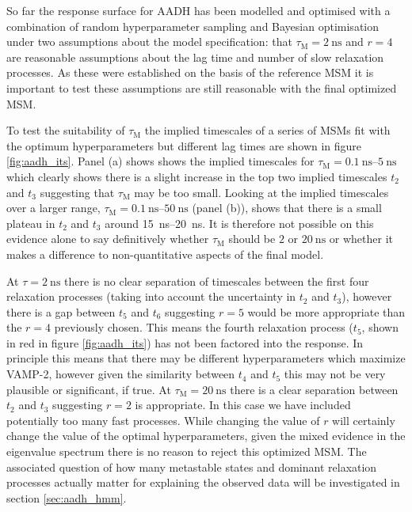 So far the response surface for AADH has been modelled and optimised with a combination of random hyperparameter sampling and Bayesian optimisation under two assumptions about the model specification: that $\tau_{\mathrm{M}} = \SI{2}{\nano\second}$ and $r=4$ are reasonable assumptions about the lag time and number of slow relaxation processes. As these were established on the basis of the reference MSM it is important to test these assumptions are still reasonable with the final optimized MSM. 

To test the suitability of $\tau_{\mathrm{M}}$ the implied timescales of a series of MSMs fit with the optimum hyperparameters but different lag times are shown in figure \ref{fig:aadh_its}. Panel (a) shows shows the implied timescales for $\tau_{\mathrm{M}} = \SIrange[range-phrase=\text{--}]{0.1}{5}{\nano\second}$ which clearly shows there is a slight increase in the top two implied timescales $t_{2}$ and $t_{3}$ suggesting that $\tau_{\mathrm{M}}$ may be too small. Looking at the implied timescales over a larger range, $\tau_{\mathrm{M}} = \SIrange[range-phrase=\text{--}]{0.1}{50}{\nano\second}$ (panel (b)), shows that there is a small plateau in $t_{2}$ and $t_{3}$  around  \SIrange{15}{20}{\nano\second}. It is therefore not possible on this evidence alone to say definitively whether $\tau_{\mathrm{M}}$ should be $2$ or $\SI{20}{\nano\second}$ or whether it makes a difference to non-quantitative aspects of the final model.  

At $\tau = \SI{2}{\nano\second}$ there is no clear separation of timescales between the first four relaxation processes (taking into account the uncertainty in $t_{2}$ and $t_{3}$), however there is a gap between $t_{5}$ and $t_{6}$ suggesting $r=5$ would be more appropriate than the $r=4$ previously chosen. This means the fourth relaxation process ($t_{5}$, shown in red in figure \ref{fig:aadh_its}) has not been factored into the response. In principle this means that there may be different hyperparameters which maximize VAMP-2, however given the similarity between $t_{4}$ and $t_{5}$ this may not be very plausible or significant, if true. At $\tau_{\mathrm{M}} = \SI{20}{\nano\second}$ there is a clear separation between $t_{2}$ and $t_{3}$ suggesting $r=2$ is appropriate. In this case we have included potentially too many fast processes. While changing the value of $r$ will certainly change the value of the optimal hyperparameters, given the mixed evidence in the eigenvalue spectrum there is no reason to reject this optimized MSM. The associated question of how many metastable states and dominant relaxation processes actually matter for explaining the observed data will be investigated in section \ref{sec:aadh_hmm}. 

